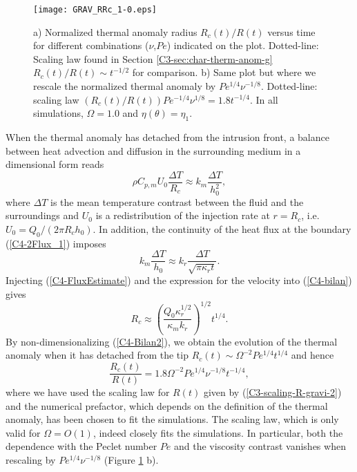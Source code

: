 \begin{figure}[h!]
  \begin{center}
    \graphicspath{ {/Users/thorey/Documents/These/Projet/Refroidissement/Skin_Model/Figure/Figure_Heating/} }
    \texttt{[image: GRAV\_RRc\_1-0.eps]}
    \caption{a) Normalized thermal anomaly radius $R_c(t)/R(t)$ versus
      time for  different combinations  ($\nu$,$Pe$) indicated  on the
      plot.     Dotted-line:   Scaling    law    found   in    Section
      \ref{C3-sec:char-therm-anom-g}  $R_c(t)/R(t)\sim  t^{-1/2}$  for
      comparison.  b)  Same plot but  where we rescale  the normalized
      thermal anomaly  by $Pe^{1/4}\nu^{-1/8}$.   Dotted-line: scaling
      law  $(R_c(t)/R(t))Pe^{-1/4}\nu^{1/8}=   1.8t^{-1/4}$.   In  all
      simulations, $\Omega=1.0$ and $\eta(\theta)=\eta_1$.}
    \label{C4-GRAV_RRc_RArrhenius_1-0}
  \end{center}
\end{figure}

When  the thermal  anomaly has  detached from  the intrusion  front, a
balance between heat advection and diffusion in the surrounding medium
in a dimensional form reads
\begin{equation}
  \rho C_{p,m} U_0 \frac{\Delta T}{R_c} \approx k_m \frac{\Delta T}{h_0^2},
  \label{C4-bilan}
\end{equation}
where $\Delta  T$ is the  mean temperature contrast between  the fluid
and the  surroundings and $U_0$  is a redistribution of  the injection
rate at  $r=R_c$, i.e.   $U_0=Q_0/(2\pi R_c  h_0)$.  In  addition, the
continuity of the heat flux at the boundary (\ref{C4-2Flux_1}) imposes
\begin{equation}
  k_m\frac{\Delta   T}{h_0}\approx   k_r   \frac{\Delta   T}{\sqrt{\pi
      \kappa_r t}}.
  \label{C4-FluxEstimate}
\end{equation}
Injecting (\ref{C4-FluxEstimate}) and the  expression for the velocity
into (\ref{C4-bilan}) gives
\begin{equation}
  R_c \approx  \left(\frac{Q_0\kappa_r^{1/2}}{\kappa_m k_r}\right)^{1/2}
  t^{1/4}.
  \label{C4-Bilan2}
\end{equation}
By non-dimensionalizing (\ref{C4-Bilan2}), we  obtain the evolution of
the   thermal   anomaly   when   it  has   detached   from   the   tip
$R_c(t)\sim \Omega^{-2}Pe^{1/4}t^{1/4}$ and hence
\begin{equation}
  \frac{R_c(t)}{R(t)} = 1.8\Omega^{-2}Pe^{1/4}\nu^{-1/8}t^{-1/4},
  \label{C4-Rc}
\end{equation}
where   we  have   used  the   scaling   law  for   $R(t)$  given   by
(\ref{C3-scaling-R-gravi-2})  and   the  numerical   prefactor,  which
depends on the  definition of the thermal anomaly, has  been chosen to
fit  the  simulations.  The  scaling  law,  which  is only  valid  for
$\Omega = O(1)$,  indeed closely fits the  simulations. In particular,
both  the dependence  with the  Peclet number  $Pe$ and  the viscosity
contrast  vanishes  when  rescaling  by  $Pe^{1/4}\nu^{-1/8}$  (Figure
\ref{C4-GRAV_RRc_RArrhenius_1-0} b).

